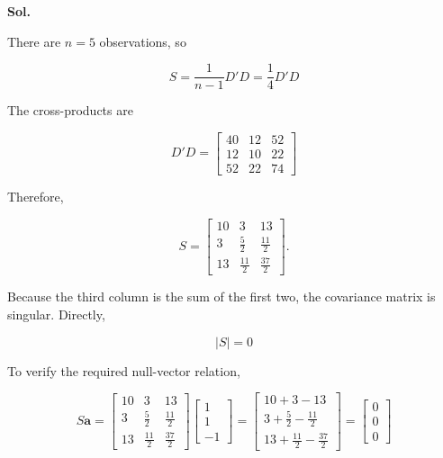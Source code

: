 \documentclass[12pt]{article}
\begin{document}
\vspace{0.2cm}

\textbf{Sol.}

\vspace{0.2cm}

There are $n=5$ observations, so

\vspace{0.2cm}

\[
S=\frac{1}{n-1}D'D=\frac14D'D
\]

\vspace{0.2cm}

The cross-products are

\vspace{0.2cm}

\[
D'D=
\begin{bmatrix}
40&12&52\\
12&10&22\\
52&22&74
\end{bmatrix}
\]

\vspace{0.2cm}

Therefore,

\vspace{0.2cm}

\[
\boxed{
S=\begin{bmatrix}
10&3&13\\
3&\frac52&\frac{11}{2}\\
13&\frac{11}{2}&\frac{37}{2}
\end{bmatrix}.}
\]

\vspace{0.2cm}

Because the third column is the sum of the first two, the covariance matrix is singular. Directly,

\vspace{0.2cm}

\[
|S|=\boxed{0}
\]

\vspace{0.2cm}

To verify the required null-vector relation,

\vspace{0.2cm}

\[
S\boldsymbol{a}
=
\begin{bmatrix}
10&3&13\\
3&\frac52&\frac{11}{2}\\
13&\frac{11}{2}&\frac{37}{2}
\end{bmatrix}
\begin{bmatrix}1\\1\\-1\end{bmatrix}
=
\begin{bmatrix}
10+3-13\\
3+\frac52-\frac{11}{2}\\
13+\frac{11}{2}-\frac{37}{2}
\end{bmatrix}
=
\boxed{\begin{bmatrix}0\\0\\0\end{bmatrix}}
\]
\end{document}
